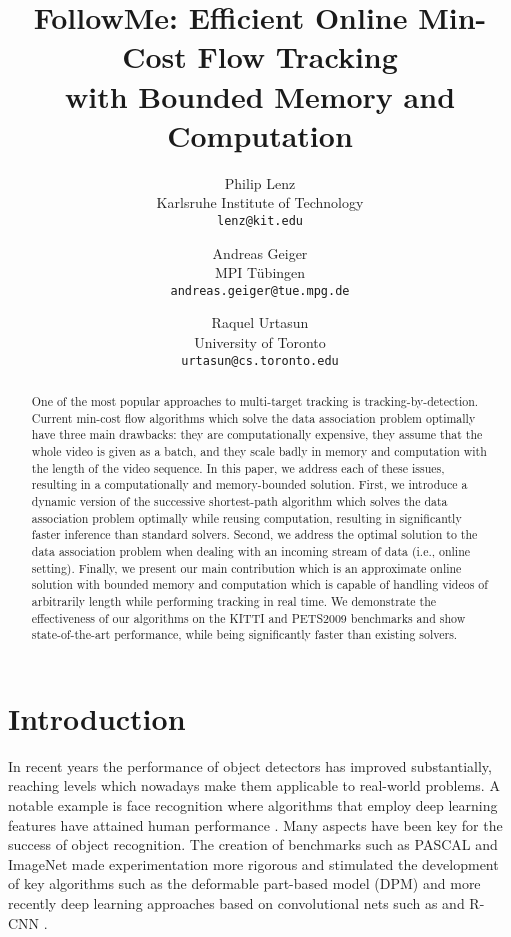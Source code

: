 \documentclass[10pt,twocolumn,letterpaper]{article}
\begin{document}
\title{FollowMe: Efficient Online Min-Cost Flow Tracking\\with Bounded Memory and Computation}

\author{Philip Lenz\\
Karlsruhe Institute of Technology\\
{\tt\small lenz@kit.edu}
\and
Andreas Geiger\\
MPI T\"ubingen\\
{\tt\small andreas.geiger@tue.mpg.de}
\and
Raquel Urtasun\\
University of Toronto\\
{\tt\small urtasun@cs.toronto.edu}
}

\maketitle

\begin{abstract}
One of the most popular approaches to multi-target tracking is tracking-by-detection. Current  min-cost flow algorithms which solve the data association problem optimally have three main drawbacks: they are computationally expensive, they assume that the whole video is given as a batch, and they scale badly in memory and computation with the length of the video sequence. In this paper, we address each of these issues, resulting in a computationally and memory-bounded solution. First, we introduce a dynamic version of the successive shortest-path algorithm  which solves the data association problem optimally while reusing computation, resulting in significantly faster inference than standard solvers. Second, we address the optimal solution to the data association problem when dealing with an incoming stream of data (i.e., online setting). Finally, we present our main contribution which is an approximate online solution with bounded memory and computation which is capable of handling videos of arbitrarily length while performing tracking in real time. We demonstrate the effectiveness of our algorithms on the KITTI and PETS2009 benchmarks and show state-of-the-art performance, while being significantly faster than existing solvers. 
\end{abstract}

 \section{Introduction}

In recent years the performance of object detectors has improved substantially, reaching levels which nowadays make them applicable to real-world problems. A notable example is face recognition where algorithms that employ deep learning features have attained human performance \cite{Taigman2014CVPR}.
Many aspects have been key for the success of object recognition.  The creation of benchmarks such as PASCAL \cite{Everingham2010IJCV} and ImageNet \cite{Russakovsky2014ARXIV} made experimentation more rigorous and stimulated the development of key algorithms such as the deformable part-based model (DPM) \cite{Felzenszwalb2010PAMI} and more recently deep learning approaches based on  convolutional nets such as \cite{Krizhevsky2012NIPS}  and R-CNN \cite{Girshick2014CVPR}. 
\end{document}
